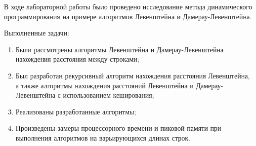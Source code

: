 
В ходе лабораторной работы было проведено исследование метода динамического программирования на примере алгоритмов Левенштейна и Дамерау-Левенштейна.

Выполненные задачи:
\begin{enumerate}
	\item Были рассмотрены алгоритмы Левенштейна и Дамерау-Левенштейна нахождения расстояния между строками;
	\item Был разработан рекурсивный алгоритм нахождения расстояния Левенштейна, а также алгоритмы нахождения расстояний Левенштейна и Дамерау-Левенштейна с использованием кеширования; 
	\item Реализованы разработанные алгоритмы; 
	\item Произведены замеры процессорного времени и пиковой памяти при выполнения алгоритмов на варьирующихся длинах строк.
\end{enumerate}
